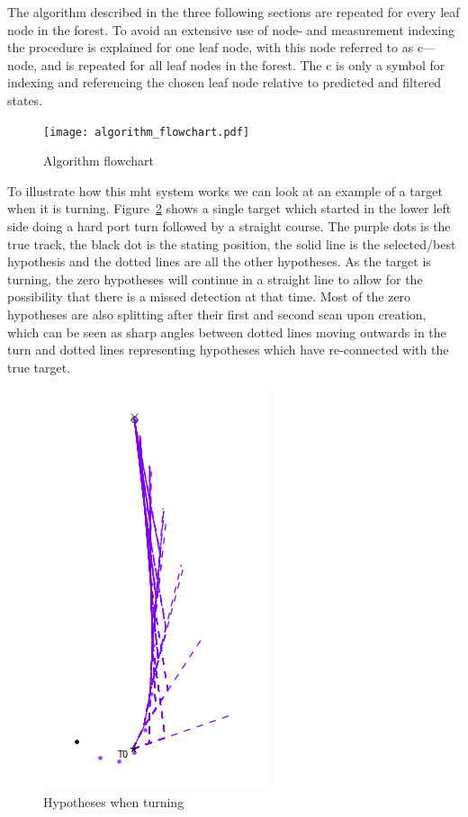  The algorithm described in the three following sections are repeated for every leaf node in the forest. To avoid an extensive use of node- and measurement indexing the procedure is explained for one leaf node, with this node referred to as c---node, and is repeated for all leaf nodes in the forest. The c is only a symbol for indexing and referencing the chosen leaf node relative to predicted and filtered states. 
\begin{figure}[H]
\centering
\texttt{[image: algorithm\_flowchart.pdf]}
\caption{Algorithm flowchart}\label{fig:algorithm_flow}
\end{figure}

To illustrate how this \gls{mht} system works we can look at an example of a target when it is turning. Figure~\ref{fig:hypotheses_when_turning} shows a single target which started in the lower left side doing a hard port turn followed by a straight course. The purple dots is the true track, the black dot is the stating position, the solid line is the selected/best hypothesis and the dotted lines are all the other hypotheses. As the target is turning, the zero hypotheses will continue in a straight line to allow for the possibility that there is a missed detection at that time. Most of the zero hypotheses are also splitting after their first and second scan upon creation, which can be seen as sharp angles between dotted lines moving outwards in the turn and dotted lines representing hypotheses which have re-connected with the true target.
\begin{figure}[H]
\centering
\includegraphics[height = .5\textheight]{Figures/Hypotheses_when_turning.PNG}
\caption{Hypotheses when turning}\label{fig:hypotheses_when_turning}
\end{figure}

